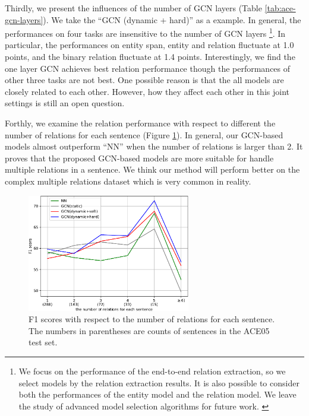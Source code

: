 Thirdly, we present the influences of the number of GCN layers (Table \ref{tab:ace-gcn-layers}).
We take the ``GCN (dynamic + hard)'' as a example.
In general, 
the performances on four tasks are insensitive to the number of GCN layers \footnote{
We focus on the performance of the end-to-end
relation extraction, so we select models 
by the relation extraction results. 
It is also possible to consider both the 
performances of the entity model and the relation model.
We leave the study of advanced model selection algorithms 
for future work.
\label{foot:model_sel}
}.
In particular,
the performances on entity span, entity and relation fluctuate at 1.0 points,
and the binary relation fluctuate at 1.4 points.
Interestingly, 
we find the one layer GCN achieves best relation performance
though the performances of other three tasks are not best. 
One possible reason is that the all models are closely related to each other. However, how they affect each other in this joint settings is still
an open question.

Forthly,
we examine the relation performance with respect to different the number of relations for each sentence (Figure \ref{fig:rel_num}).
In general,
our GCN-based models almost outperform ``NN'' when the number of relations is larger than 2.
It proves that the proposed GCN-based models are more suitable for handle
multiple relations in a sentence.
We think our method will perform better 
on the complex multiple relations dataset
which is very common in reality.

\begin{figure}
    \begin{center}
        \includegraphics[width=2.8in]{../images/fig-rel-num.pdf}
    \end{center}
   \caption{F1 scores with respect to the number of relations for each sentence.
    The numbers in parentheses are counts of sentences in the ACE05 test set.}
    \label{fig:rel_num}
\end{figure}


